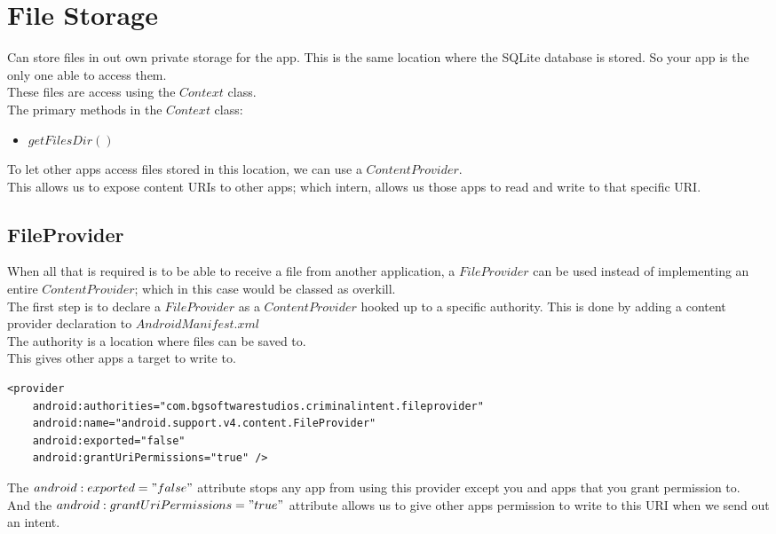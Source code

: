 \documentclass[]{article}
\begin{document}
\section{File Storage}
Can store files in out own private storage for the app.  This is the same location where the SQLite database is stored.  So your app is the only one able to access them.
\\
These files are access using the $Context$ class.
\\
The primary methods in the $Context$ class:
\begin{itemize}
	\item  $getFilesDir()$
\end{itemize}
To let other apps access files stored in this location, we can use a $ContentProvider$.
\\
This allows us to expose content URIs to other apps; which intern, allows us those apps to read and write to that specific URI.

\subsection{FileProvider}
When all that is required is to be able to receive a file from another application, a $FileProvider$ can be used instead of implementing an entire $ContentProvider$; which in this case would be classed as overkill.
\\
The first step is to declare a $FileProvider$ as a $ContentProvider$ hooked up to a specific authority.  This is done by adding a content provider declaration to $AndroidManifest.xml$
\\
The authority is a location where files can be saved to.
\\
This gives other apps a target to write to.
\begin{lstlisting}
<provider
	android:authorities="com.bgsoftwarestudios.criminalintent.fileprovider"
	android:name="android.support.v4.content.FileProvider"
	android:exported="false"
	android:grantUriPermissions="true" />
\end{lstlisting}
The $android:exported="false"$ attribute stops any app from using this provider except you and apps that you grant permission to.
\\
And the $android:grantUriPermissions="true" $ attribute allows us to give other apps permission to write to this URI when we send out an intent.
\end{document}
